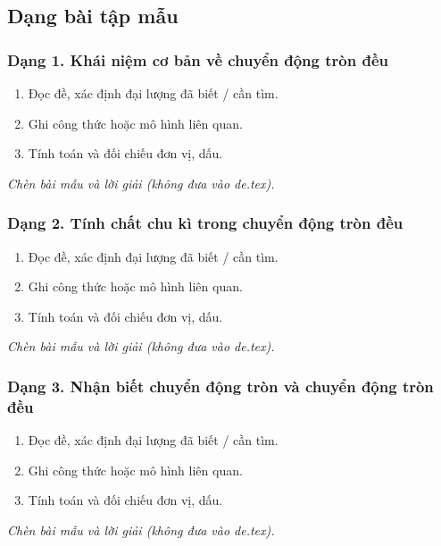 

\subsection{Dạng bài tập mẫu}
\subsubsection{Dạng 1. Khái niệm cơ bản về chuyển động tròn đều}
\begin{phuongphap}
\begin{enumerate}
\item Đọc đề, xác định đại lượng đã biết / cần tìm.
\item Ghi công thức hoặc mô hình liên quan.
\item Tính toán và đối chiếu đơn vị, dấu.
\end{enumerate}
\end{phuongphap}
\begin{vidumau}
\textit{Chèn bài mẫu và lời giải (không đưa vào de.tex).}
\end{vidumau}

\subsubsection{Dạng 2. Tính chất chu kì trong chuyển động tròn đều}
\begin{phuongphap}
\begin{enumerate}
\item Đọc đề, xác định đại lượng đã biết / cần tìm.
\item Ghi công thức hoặc mô hình liên quan.
\item Tính toán và đối chiếu đơn vị, dấu.
\end{enumerate}
\end{phuongphap}
\begin{vidumau}
\textit{Chèn bài mẫu và lời giải (không đưa vào de.tex).}
\end{vidumau}

\subsubsection{Dạng 3. Nhận biết chuyển động tròn và chuyển động tròn đều}
\begin{phuongphap}
\begin{enumerate}
\item Đọc đề, xác định đại lượng đã biết / cần tìm.
\item Ghi công thức hoặc mô hình liên quan.
\item Tính toán và đối chiếu đơn vị, dấu.
\end{enumerate}
\end{phuongphap}
\begin{vidumau}
\textit{Chèn bài mẫu và lời giải (không đưa vào de.tex).}
\end{vidumau}

